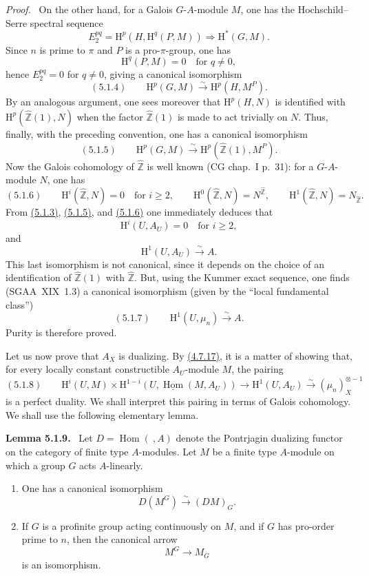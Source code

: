\documentclass[11pt]{article}
\providecommand{\uHom}{\underline{\Hom}}
\newenvironment{statement}[1]{\par\medskip\noindent\textbf{#1.}\ }{\par\medskip}
\newenvironment{prooftext}[1][Proof]{\par\noindent\emph{#1.}\ }{\par\medskip}
\renewcommand{\H}{\mathrm{H}}
\DeclareMathOperator{\Hom}{Hom}
\newcommand{\Z}{\mathbb{Z}}
\providecommand{\Hom}{\operatorname{Hom}}
\providecommand{\Z}{\mathbb Z}
\providecommand{\Hom}{\operatorname{Hom}}
\begin{document}
\begin{prooftext}[Proof]
On the other hand, for a Galois $G$-$A$-module $M$, one has the Hochschild--Serre spectral sequence
\[
E_2^{pq}=\H^p(H,\H^q(P,M))\Longrightarrow \H^{*}(G,M).
\]
Since $n$ is prime to $\pi$ and $P$ is a pro-$\pi$-group, one has
\[
\H^q(P,M)=0\quad\text{for }q\ne0,
\]
hence $E_2^{pq}=0$ for $q\ne0$, giving a canonical isomorphism
\label{sga5:I:equation:5.1.4}\[
(5.1.4)\qquad \H^p(G,M)\xrightarrow{\sim}\H^p(H,M^P).
\]
By an analogous argument, one sees moreover that $\H^p(H,N)$ is identified with $\H^p(\widehat{\Z}(1),N)$ when the factor $\widehat{\Z}(1)$ is made to act trivially on $N$. Thus, finally, with the preceding convention, one has a canonical isomorphism
\label{sga5:I:equation:5.1.5}\[
(5.1.5)\qquad \H^p(G,M)\xrightarrow{\sim}\H^p(\widehat{\Z}(1),M^P).
\]
Now the Galois cohomology of $\widehat{\Z}$ is well known (CG chap.~I p.~31): for a $G$-$A$-module $N$, one has
\label{sga5:I:equation:5.1.6}\[
(5.1.6)\qquad
\H^i(\widehat{\Z},N)=0\quad\text{for }i\geqslant2,
\qquad
\H^0(\widehat{\Z},N)=N^{\widehat{\Z}},
\qquad
\H^1(\widehat{\Z},N)=N_{\widehat{\Z}}.
\]
From \hyperref[sga5:I:equation:5.1.3]{(5.1.3)}, \hyperref[sga5:I:equation:5.1.5]{(5.1.5)}, and \hyperref[sga5:I:equation:5.1.6]{(5.1.6)} one immediately deduces that
\[
\H^i(U,A_U)=0\quad\text{for }i\geqslant2,
\]
and
\[
\H^1(U,A_U)\xrightarrow{\sim}A.
\]
This last isomorphism is not canonical, since it depends on the choice of an identification of $\widehat{\Z}(1)$ with $\widehat{\Z}$. But, using the Kummer exact sequence, one finds (SGAA~XIX~1.3) a canonical isomorphism (given by the ``local fundamental class'')
\label{sga5:I:equation:5.1.7}\[
(5.1.7)\qquad \H^1(U,\mu_n)\xrightarrow{\sim}A.
\]
Purity is therefore proved.

Let us now prove that $A_X$ is dualizing. By \hyperref[sga5:I:remark:4.7.17]{(4.7.17)}, it is a matter of showing that, for every locally constant constructible $A_U$-module $M$, the pairing
\label{sga5:I:equation:5.1.8}\[
(5.1.8)\qquad \H^i(U,M)\times\H^{1-i}(U,\uHom(M,A_U))\longrightarrow \H^1(U,A_U)\xrightarrow{\sim}(\mu_n)_X^{\otimes -1}
\]
is a perfect duality. We shall interpret this pairing in terms of Galois cohomology. We shall use the following elementary lemma.
\end{prooftext}

\label{sga5:I:lemma:5.1.9}\begin{statement}{Lemma 5.1.9}
Let $D=\Hom(\ ,A)$ denote the Pontrjagin dualizing functor on the category of finite type $A$-modules. Let $M$ be a finite type $A$-module on which a group $G$ acts $A$-linearly.
\begin{enumerate}[label=(\roman*)]
\item One has a canonical isomorphism
\[
D(M^G)\xrightarrow{\sim}(DM)_G.
\]
\item If $G$ is a profinite group acting continuously on $M$, and if $G$ has pro-order prime to $n$, then the canonical arrow
\[
M^G\longrightarrow M_G
\]
is an isomorphism.
\end{enumerate}
\end{statement}
\end{document}
